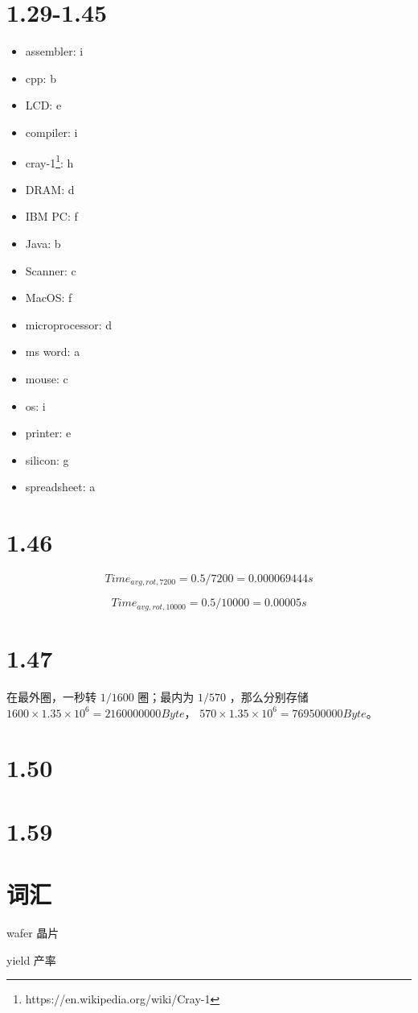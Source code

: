 \documentclass[lang=cn,11pt,a4paper,cite=authoryear]{elegantpaper}
\begin{document}
\section{1.29-1.45}

\begin{itemize}
    \item assembler: i 
    \item cpp: b
    \item LCD: e 
    \item compiler: i 
    \item cray-1\footnote{https://en.wikipedia.org/wiki/Cray-1}: h
    \item DRAM: d
    \item IBM PC: f
    \item Java: b
    \item Scanner: c 
    \item MacOS: f 
    \item microprocessor: d
    \item ms word: a 
    \item mouse: c
    \item os: i 
    \item printer: e 
    \item silicon: g 
    \item spreadsheet: a
\end{itemize}

\section{1.46}

\[Time_{avg,rot,7200} = 0.5 / 7200 = 0.000069444 s\]

\[Time_{avg,rot,10000} = 0.5 / 10000 = 0.00005 s\]

\section{1.47}

在最外圈，一秒转 \(1/1600\) 圈；最内为 \(1/570\) ，那么分别存储 \(1600 \times 1.35 \times 10^6 = 2160000000 Byte\)， \(570 \times 1.35 \times 10^6 = 769500000 Byte\)。

\section{1.50}



\section{1.59}

\section*{词汇}

wafer 晶片

yield 产率

\end{document}
